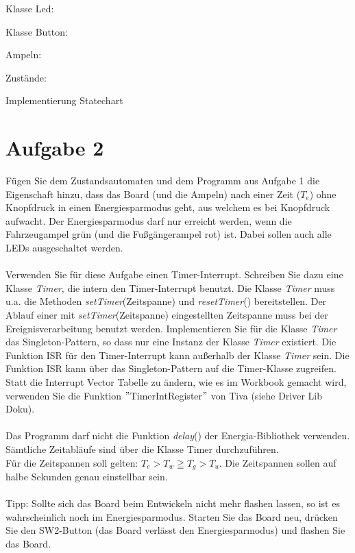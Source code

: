 \newpage
\noindent Klasse Led:

\noindent Klasse Button:

\noindent Ampeln:

\noindent Zustände:

\noindent Implementierung Statechart


\section{Aufgabe 2}
Fügen Sie dem Zustandsautomaten und dem Programm aus Aufgabe 1 die Eigenschaft hinzu, dass das Board (und die Ampeln) nach einer Zeit ($T_e$) ohne Knopfdruck in einen Energiesparmodus geht, aus welchem es bei Knopfdruck aufwacht. Der Energiesparmodus darf nur erreicht werden, wenn die Fahrzeugampel grün (und die Fu\ss{}gängerampel rot) ist. Dabei sollen auch alle LEDs ausgeschaltet werden.\\ \\
Verwenden Sie für diese Aufgabe einen Timer-Interrupt. Schreiben Sie dazu eine Klasse \textit{Timer}, die intern den Timer-Interrupt benutzt. Die Klasse \textit{Timer} muss u.a. die Methoden \textit{setTimer}(Zeitspanne) und \textit{resetTimer}() bereitstellen. Der Ablauf einer mit \textit{setTimer}(Zeitspanne) eingestellten Zeitspanne muss bei der Ereignisverarbeitung benutzt werden. Implementieren Sie für die Klasse \textit{Timer} das Singleton-Pattern, so dass nur eine Instanz der Klasse \textit{Timer} existiert. Die Funktion ISR für den Timer-Interrupt kann au\ss{}erhalb der Klasse \textit{Timer} sein. Die Funktion ISR kann über das Singleton-Pattern auf die Timer-Klasse zugreifen.\\
Statt die Interrupt Vector Tabelle zu ändern, wie es im Workbook gemacht wird, verwenden Sie die Funktion $"$TimerIntRegister$"$ von Tiva (siehe Driver Lib Doku).\\ \\
Das Programm darf nicht die Funktion \textit{delay}() der Energia-Bibliothek verwenden. Sämtliche Zeitabläufe sind über die Klasse Timer durchzuführen.\\
Für die Zeitspannen soll gelten: $T_e > T_w \geqq T_g > T_u$. Die Zeitspannen sollen auf halbe Sekunden genau einstellbar sein.\\ \\
Tipp: Sollte sich das Board beim Entwickeln nicht mehr flashen lassen, so ist es wahrscheinlich noch im Energiesparmodus. Starten Sie das Board neu, drücken Sie den SW2-Button (das Board verlässt den Energiesparmodus) und flashen Sie das Board.
